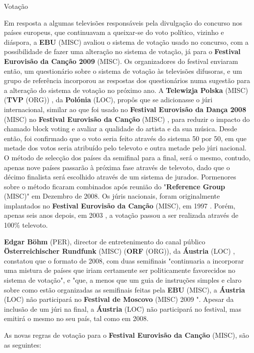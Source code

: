 \documentclass[12pt,a4paper]{article}
\begin{document}
Votação

Em resposta a algumas televisões responsáveis pela divulgação do concurso nos países europeus, que continuavam a queixar-se do voto político, vizinho e diáspora, a \textbf{EBU} (MISC) avaliou o sistema de votação usado no concurso, com a possibilidade de fazer uma alteração no sistema de votação, já para o \textbf{Festival Eurovisão da Canção 2009} (MISC). Os organizadores do festival enviaram então, um questionário sobre o sistema de votação às televisões difusoras, e um grupo de referência incorporou as respostas dos questionários numa sugestão para a alteração do sistema de votação no próximo ano. A \textbf{Telewizja Polska} (MISC) (\textbf{TVP} (ORG)) , da \textbf{Polónia} (LOC), propôs que se adicionasse o júri internacional, similar ao que foi usado no \textbf{Festival Eurovisão da Dança 2008} (MISC) no \textbf{Festival Eurovisão da Canção} (MISC) , para reduzir o impacto do chamado block voting e avaliar a qualidade do artista e da sua música. Desde então, foi confirmado que o voto seria feito através do sistema 50 por 50, em que metade dos votos seria atribuído pelo televoto e outra metade pelo júri nacional. O método de selecção dos países da semifinal para a final, será o mesmo, contudo, apenas nove países passarão à próxima fase através de televoto, dado que o décimo finalista será escolhido através de um sistema de jurados. Pormenores sobre o método ficaram combinados após reunião do "\textbf{Reference Group} (MISC)" em Dezembro de 2008. Os júris nacionais, foram originalmente implantados no \textbf{Festival Eurovisão da Canção} (MISC), em 1997 . Porém, apenas seis anos depois, em 2003 , a votação passou a ser realizada através de 100\% televoto.

\textbf{Edgar Böhm} (PER), director de entretenimento do canal público \textbf{Österreichischer Rundfunk} (MISC) (\textbf{ORF} (ORG)), da \textbf{Áustria} (LOC) , constatou que o formato de 2008, com duas semifinais "continuaria a incorporar uma mistura de países que iriam certamente ser politicamente favorecidos no sistema de votação", e "que, a menos que um guia de instruções simples e claro sobre como estão organizadas as semifinais feitas pela \textbf{EBU} (MISC), a \textbf{Áustria} (LOC) não participará no \textbf{Festival de Moscovo} (MISC) 2009 ". Apesar da inclusão de um júri na final, a \textbf{Áustria} (LOC) não participará no festival, mas emitirá o mesmo no seu país, tal como em 2008.

As novas regras de votação para o \textbf{Festival Eurovisão da Canção} (MISC), são as seguintes:
\end{document}
